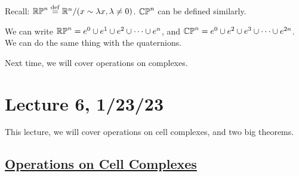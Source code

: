 \documentclass[x11names,reqno,14pt]{extarticle}
\begin{document}
Recall: ${\mathbb{RP}}^n \overset{\mathrm{def}}{=} \mathbb{R}^n/(x\sim\lambda x, \lambda\neq0)$. ${\mathbb{CP}}^n$ can be defined similarly. 

We can write ${\mathbb{RP}}^n = e^0 \cup e^1 \cup e^2 \cup \cdots \cup e^n$, and ${\mathbb{CP}}^n = e^0 \cup e^2 \cup e^3 \cup \cdots \cup e^{2n}$. We can do the same thing with the quaternions. 

Next time, we will cover operations on complexes. 

\section*{Lecture 6, 1/23/23}

This lecture, we will cover operations on cell complexes, and two big theorems.

\subsection*{\underline{Operations on Cell Complexes}}
\end{document}
